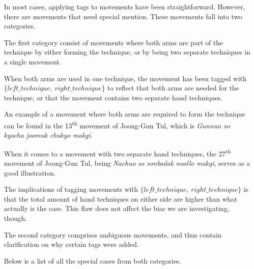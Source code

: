 \documentclass[10pt,twocolumn,a4paper]{article}
\begin{document}
  In most cases, applying tags to movements have been straightforward.
  However, there are movements that need special mention. These movements
  fall into two categories.

  The first category consist of movements where both arms are part of the
  technique by either forming the technique, or by being two separate
  techniques in a single movement.

  When both arms are used in one technique, the movement has been tagged with
  $\{left\_technique, \: right\_technique\}$ to reflect that both arms are
  needed for the technique, or that the movement contains two separate hand
  techniques.

  An example of a movement where both arms are required to form the technique
  can be found in the 13\textsuperscript{th} movement of Joong-Gun Tul, which
  is \emph{Gunnun so kyocha joomuk chukyo makgi}.

  When it comes to a movement with two separate hand techniques, the
  27\textsuperscript{th} movement of Joong-Gun Tul, being \emph{Nachuo so
  sonbadak noollo makgi}, serves as a good illustration.

  The implications of tagging movements with $\{left\_technique, \:
  right\_technique\}$ is that the total amount of hand techniques on either
  side are higher than what actually is the case. This flaw does not affect
  the bias we are investigating, though.

  The second category comprises ambiguous movements, and thus contain
  clarification on why certain tags were added.

  Below is a list of all the special cases from both categories.
\end{document}
